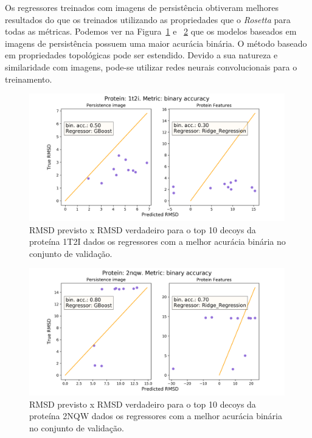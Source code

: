 Os regressores treinados com imagens de persistência obtiveram melhores resultados 
do que os treinados utilizando as propriedades que o \textit{Rosetta} para todas as métricas.
Podemos ver na Figura~\ref{fig:1t2i_binary} e ~\ref{fig:2nqw_binary} que os modelos baseados em 
imagens de persistência possuem uma maior acurácia binária. O método baseado em propriedades topológicas
pode ser estendido. Devido a sua natureza e similaridade com imagens, pode-se utilizar redes neurais 
convolucionais para o treinamento. 
\begin{figure}[!htbp]
    \centering
    \includegraphics[width=0.99\textwidth]{images/relatorio/1t2i_binary.png}
    \caption{RMSD previsto x RMSD verdadeiro para o top 10 decoys da proteína 1T2I dados os 
             regressores com a melhor acurácia binária no conjunto de validação.}
    \label{fig:1t2i_binary}
    \fautor
\end{figure}

\begin{figure}[!htbp]
    \centering
    \includegraphics[width=0.99\textwidth]{images/relatorio/2nqw_binary.png}
    \caption{RMSD previsto x RMSD verdadeiro para o top 10 decoys da proteína 2NQW dados os 
             regressores com a melhor acurácia binária no conjunto de validação.}
    \label{fig:2nqw_binary}
    \fautor
\end{figure}

